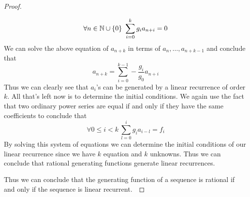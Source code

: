 \begin{proof}
\begin{itemize}
                    \[
                        \forall n \in \union{\set{N}}{\Set{0}} \ \sum_{i = 0}^{k} g_i a_{n + i} = 0
                    \]
                    We can solve the above equation of $a_{n + k}$ in terms of $a_n, \dots, a_{n + k - 1}$ and conclude that
                    \begin{equation}
                            a_{n + k} = \sum_{i = 0}^{k - 1} -\frac{g_i}{g_0} a_{n + i}
                        \label{recurrence equation}
                    \end{equation}
                    Thus we can clearly see that $a_i$'s can be generated by a linear recurrence of order $k$. All that's left now is to determine
                    the initial conditions. We again use the fact that two ordinary power series are equal if and only if they
                    have the same coefficients to conclude that
                    \begin{equation}
                        \forall 0 \le i < k \ \sum_{l = 0}^{i} g_i a_{i - l} = f_i
                        \label{initial conditions equations}
                    \end{equation}
                    By solving this system of equations we can determine the initial conditions of our linear recurrence since
                    we have $k$ equation and $k$ unknowns. Thus we can conclude that rational generating functions generate
                    linear recurrences.
            \end{itemize}
            Thus we can conclude that the generating function of a sequence is
            rational if and only if the sequence is linear recurrent.~\QED
        \end{proof}

